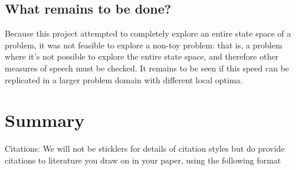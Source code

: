 \documentclass[12pt]{article}
\begin{document}
\subsection*{What remains to be done?}
Because this project attempted to completely explore an entire state space of a problem, it was not feasible to explore a non-toy problem: that is, a problem where it's not possible to explore the entire state space, and therefore other measures of speech must be checked. It remains to be seen if this speed can be replicated in a larger problem domain with different local optima.


\section{Summary}

Citations:   We will not be sticklers for details of citation styles but do provide citations to literature you draw on in your paper, using the following format
\end{document}
